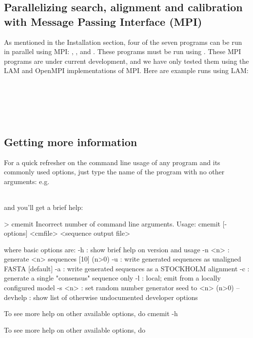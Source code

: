 \subsection{Parallelizing search, alignment and calibration with Message Passing
  Interface (MPI)}
As mentioned in the Installation section, four of
the seven  programs can be run in parallel using
MPI: , ,  and .
These programs must be run using . These MPI programs are
under current development, and we have only tested them using the LAM
and OpenMPI implementations of MPI\@. Here are example runs using LAM:  

\\

\\

\\

\\

\subsection{Getting more information}

For a quick refresher on the command line usage of any program and its
commonly used options, just type the name of the program with no other
arguments: e.g.\

\\

and you'll get a brief help:

\begin{sreoutput}
> cmemit
Incorrect number of command line arguments.
Usage: cmemit [-options] <cmfile> <sequence output file>

  where basic options are:
  -h        : show brief help on version and usage
  -n <n>    : generate <n> sequences  [10]  (n>0)
  -u        : write generated sequences as unaligned FASTA  [default]
  -a        : write generated sequences as a STOCKHOLM alignment
  -c        : generate a single "consensus" sequence only
  -l        : local; emit from a locally configured model
  -s <n>    : set random number generator seed to <n>  (n>0)
  --devhelp : show list of otherwise undocumented developer options

To see more help on other available options, do cmemit -h
\end{sreoutput}
To see more help on other available options, do 

